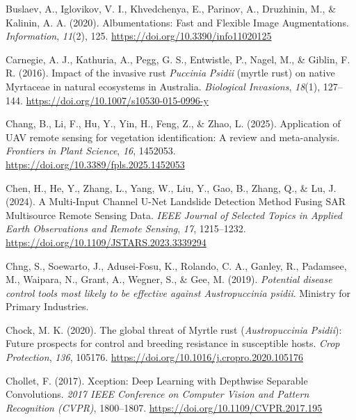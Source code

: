 \documentclass[
]{scrreprt}
\newlength{\cslhangindent}
\newenvironment{CSLReferences}[2] %
 {\begin{list}{}{%
  \setlength{\itemindent}{0pt}
  \setlength{\leftmargin}{0pt}
  \setlength{\parsep}{0pt}
  \setlength{\baselineskip}{12pt}
  \ifodd #1
   \setlength{\leftmargin}{\cslhangindent}
   \setlength{\itemindent}{-1\cslhangindent}
  \fi
  \setlength{\itemsep}{4pt}}}
 {\end{list}}
\begin{document}
\begin{CSLReferences}{1}{0}
Buslaev, A., Iglovikov, V. I., Khvedchenya, E., Parinov, A., Druzhinin,
M., \& Kalinin, A. A. (2020). Albumentations: {Fast} and {Flexible Image
Augmentations}. \emph{Information}, \emph{11}(2), 125.
\url{https://doi.org/10.3390/info11020125}

Carnegie, A. J., Kathuria, A., Pegg, G. S., Entwistle, P., Nagel, M., \&
Giblin, F. R. (2016). Impact of the invasive rust {\emph{Puccinia}}{
\emph{Psidii}} (myrtle rust) on native {Myrtaceae} in natural ecosystems
in {Australia}. \emph{Biological Invasions}, \emph{18}(1), 127--144.
\url{https://doi.org/10.1007/s10530-015-0996-y}

Chang, B., Li, F., Hu, Y., Yin, H., Feng, Z., \& Zhao, L. (2025).
Application of {UAV} remote sensing for vegetation identification: A
review and meta-analysis. \emph{Frontiers in Plant Science}, \emph{16},
1452053. \url{https://doi.org/10.3389/fpls.2025.1452053}

Chen, H., He, Y., Zhang, L., Yang, W., Liu, Y., Gao, B., Zhang, Q., \&
Lu, J. (2024). A {Multi-Input Channel U-Net Landslide Detection Method
Fusing SAR Multisource Remote Sensing Data}. \emph{IEEE Journal of
Selected Topics in Applied Earth Observations and Remote Sensing},
\emph{17}, 1215--1232. \url{https://doi.org/10.1109/JSTARS.2023.3339294}

Chng, S., Soewarto, J., Adusei-Fosu, K., Rolando, C. A., Ganley, R.,
Padamsee, M., Waipara, N., Grant, A., Wegner, S., \& Gee, M. (2019).
\emph{Potential disease control tools most likely to be effective
against {Austropuccinia} psidii}. Ministry for Primary Industries.

Chock, M. K. (2020). The global threat of {Myrtle} rust
({\emph{Austropuccinia}}{ \emph{Psidii}}): {Future} prospects for
control and breeding resistance in susceptible hosts. \emph{Crop
Protection}, \emph{136}, 105176.
\url{https://doi.org/10.1016/j.cropro.2020.105176}

Chollet, F. (2017). Xception: {Deep Learning} with {Depthwise Separable
Convolutions}. \emph{2017 {IEEE Conference} on {Computer Vision} and
{Pattern Recognition} ({CVPR})}, 1800--1807.
\url{https://doi.org/10.1109/CVPR.2017.195}


\end{CSLReferences}
\end{document}
